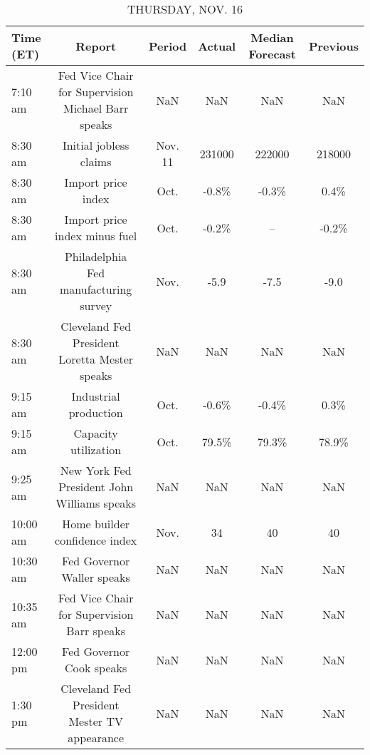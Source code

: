 \documentclass{article}%
\begin{document}
\begin{table}[htbp]%
\caption{THURSDAY, NOV. 16}%
\centering%
\begin{adjustbox}{width=1\textwidth}%
\begin{tabular}{lccccc}
\toprule
Time (ET) &                                             Report &  Period & Actual & Median Forecast & Previous \\
\midrule
  7:10 am & Fed Vice Chair for Supervision Michael Barr speaks &     NaN &    NaN &             NaN &      NaN \\
  8:30 am &                             Initial jobless claims & Nov. 11 & 231000 &          222000 &   218000 \\
  8:30 am &                                 Import price index &    Oct. &  -0.8\% &           -0.3\% &     0.4\% \\
  8:30 am &                      Import price index minus fuel &    Oct. &  -0.2\% &              -- &    -0.2\% \\
  8:30 am &              Philadelphia Fed manufacturing survey &    Nov. &   -5.9 &            -7.5 &     -9.0 \\
  8:30 am &      Cleveland Fed President Loretta Mester speaks &     NaN &    NaN &             NaN &      NaN \\
  9:15 am &                              Industrial production &    Oct. &  -0.6\% &           -0.4\% &     0.3\% \\
  9:15 am &                               Capacity utilization &    Oct. &  79.5\% &           79.3\% &    78.9\% \\
  9:25 am &        New York Fed President John Williams speaks &     NaN &    NaN &             NaN &      NaN \\
 10:00 am &                      Home builder confidence index &    Nov. &     34 &              40 &       40 \\
 10:30 am &                         Fed Governor Waller speaks &     NaN &    NaN &             NaN &      NaN \\
 10:35 am &         Fed Vice Chair for Supervision Barr speaks &     NaN &    NaN &             NaN &      NaN \\
 12:00 pm &                           Fed Governor Cook speaks &     NaN &    NaN &             NaN &      NaN \\
  1:30 pm &       Cleveland Fed President Mester TV appearance &     NaN &    NaN &             NaN &      NaN \\
\bottomrule
\end{tabular}
%
\end{adjustbox}%
\end{table}
\end{document}
